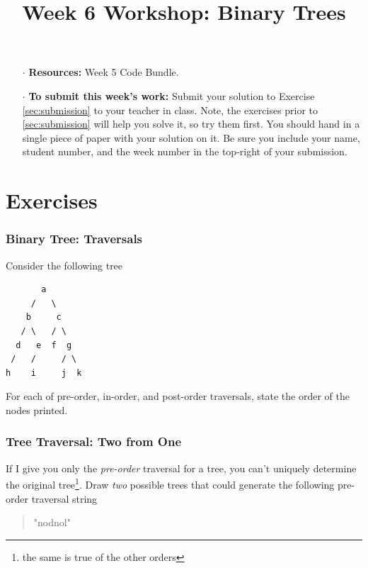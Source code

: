\documentclass[twoside=false,DIV=14]{scrartcl}
\title{\color{redish} \vspace{-2em}Week 6 Workshop: Binary Trees}
\begin{document}
{\color{blackish}\maketitle}\vspace{-2em}%
\begin{itemize}
    \item[$\cdot$] {\bf Resources:}  Week 5  Code Bundle.
    \item[$\cdot$] {\bf To submit this week's work:} Submit your solution to Exercise \ref{sec:submission} to your teacher in class.  Note, the exercises prior to \ref{sec:submission} will help you solve it, so try them first.  You should hand in a single piece of paper with your solution on it.  Be sure you include your name, student number, and the week number in the top-right of your submission.
\end{itemize}

\part*{Exercises}

\section{Binary Tree: Traversals}
Consider the following tree


    
\begin{verbatim}
       a
     /   \
    b     c
   / \   / \
  d   e  f  g
 /   /     / \
h    i     j  k 
\end{verbatim}
            
For each of pre-order, in-order, and post-order traversals, state the order of the nodes printed. 

\section{Tree Traversal: Two from One}

If I give you only the \emph{pre-order} traversal for a tree, you can't uniquely determine the original tree\footnote{the same is true of the other orders}.  Draw \emph{two} possible trees that could generate the following pre-order traversal string
\begin{quote}
"nodnol"
\end{quote}
    
\end{document}
